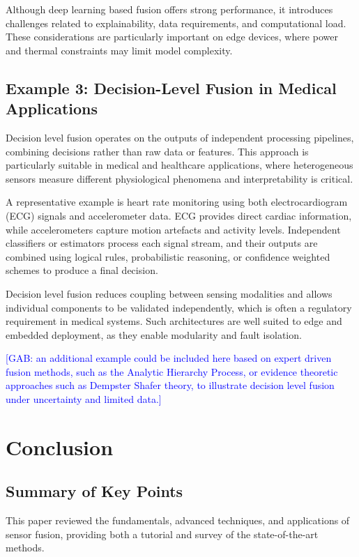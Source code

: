 \documentclass[journal]{IEEEtran}
\begin{document}
Although deep learning based fusion offers strong performance, it introduces challenges related to explainability, data requirements, and computational load. These considerations are particularly important on edge devices, where power and thermal constraints may limit model complexity.

\subsection{Example 3: Decision-Level Fusion in Medical Applications}

Decision level fusion operates on the outputs of independent processing pipelines, combining decisions rather than raw data or features. This approach is particularly suitable in medical and healthcare applications, where heterogeneous sensors measure different physiological phenomena and interpretability is critical.

A representative example is heart rate monitoring using both electrocardiogram (ECG) signals and accelerometer data. ECG provides direct cardiac information, while accelerometers capture motion artefacts and activity levels. Independent classifiers or estimators process each signal stream, and their outputs are combined using logical rules, probabilistic reasoning, or confidence weighted schemes to produce a final decision.

Decision level fusion reduces coupling between sensing modalities and allows individual components to be validated independently, which is often a regulatory requirement in medical systems. Such architectures are well suited to edge and embedded deployment, as they enable modularity and fault isolation.

\textcolor{blue}{[GAB: an additional example could be included here based on expert driven fusion methods, such as the Analytic Hierarchy Process, or evidence theoretic approaches such as Dempster Shafer theory, to illustrate decision level fusion under uncertainty and limited data.]}



\section{Conclusion}

\subsection{Summary of Key Points}
This paper reviewed the fundamentals, advanced techniques, and applications of sensor fusion, providing both a tutorial and survey of the state-of-the-art methods.
\end{document}
